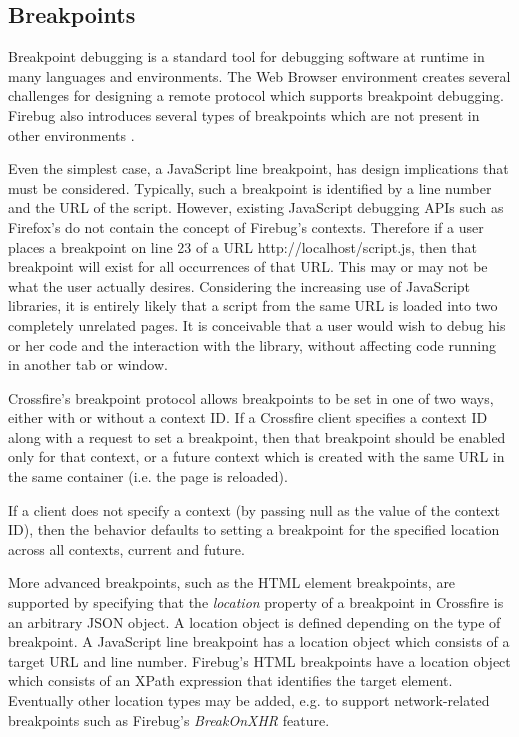 \subsection {Breakpoints}
Breakpoint debugging is a standard tool for debugging software at runtime in
many languages and environments. The Web Browser environment creates several
challenges for designing a remote protocol which supports breakpoint debugging.
Firebug also introduces several types of breakpoints which are not present in
other environments \cite{jjb-www2010}.

Even the simplest case, a JavaScript line breakpoint, has design implications
that must be considered. Typically, such a breakpoint is identified by a line
number and the URL of the script. However, existing JavaScript debugging APIs
such as Firefox's do not contain the concept of Firebug's contexts.  Therefore
if a user places a breakpoint on line 23 of a URL http://localhost/script.js,
then that breakpoint will exist for all occurrences of that URL. This may or may
not be what the user actually desires.  Considering the increasing use of
JavaScript libraries, it is entirely likely that a script from the same URL is
loaded into two completely unrelated pages. It is conceivable that a user would
wish to debug his or her code and the interaction with the library, without
affecting code running in another tab or window.

Crossfire's breakpoint protocol allows breakpoints to be set in one of two ways,
either with or without a context ID. If a Crossfire client specifies a context
ID along with a request to set a breakpoint, then that breakpoint should be
enabled only for that context, or a future context which is created with the
same URL in the same container (i.e. the page is reloaded).

If a client does not specify a context (by passing null as the value of the
context ID), then the behavior defaults to setting a breakpoint for the
specified location across all contexts, current and future.

More advanced breakpoints, such as the HTML element breakpoints, are supported
by specifying that the \textit{location} property of a breakpoint in Crossfire
is an arbitrary JSON object. A location object is defined depending on
the type of breakpoint.  A JavaScript line breakpoint has a location object
which consists of a target URL and line number. Firebug's HTML breakpoints have
a location object which consists of an XPath expression that identifies the
target element.  Eventually other location types may be added, e.g. to support
network-related breakpoints such as Firebug's \textit{BreakOnXHR} feature.
